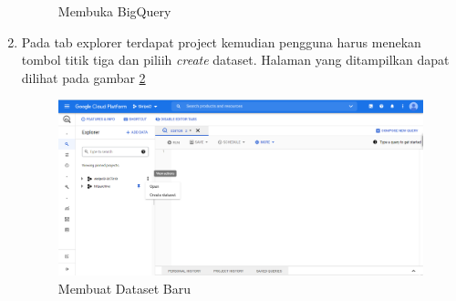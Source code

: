 \begin{enumerate}
\begin{figure}[H]
		\caption{Membuka BigQuery} 
		\label{fig:BQ} 
	\end{figure}
	\item Pada tab explorer terdapat project kemudian pengguna harus menekan tombol titik tiga dan piliih \textit{create} dataset. Halaman yang ditampilkan dapat dilihat pada gambar \ref{fig:create_dataset}
	\begin{figure}[H]
		\centering  
		\includegraphics[scale=0.45]{Gambar/create_dataset.PNG}  
		\caption{Membuat Dataset Baru} 
		\label{fig:create_dataset} 
	\end{figure}
\end{enumerate}

